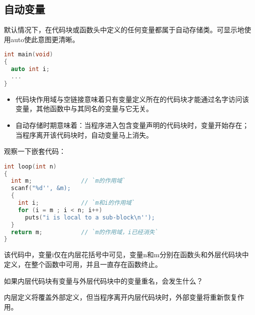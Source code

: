 \subsection{自动变量}
\begin{frame}[fragile]\ft{\subsecname}
默认情况下，在代码块或函数头中定义的任何变量都属于自动存储类。可显示地使用{\tf auto}使此意图更清晰。
\begin{lstlisting}[language=c,frame=single]
int main(void)
{
  auto int i;
  ...
}  
\end{lstlisting}
\end{frame}

\begin{frame}[fragile]\ft{\subsecname}
  \begin{itemize}
  \item \textcolor{acolor1}{代码块作用域与空链接}意味着只有变量定义所在的代码块才能通过名字访问该变量，其他函数中与其同名的变量与它无关。\\[0.1in]
  \item 自动存储时期意味着：\textcolor{acolor3}{当程序进入包含变量声明的代码块时，变量开始存在；当程序离开该代码块时，自动变量马上消失。}
  \end{itemize}
\end{frame}

\begin{frame}[fragile]\ft{\subsecname}
观察一下嵌套代码：
\begin{lstlisting}[language=c,frame=single]
int loop(int n)
{
  int m;              // `m的作用域`
  scanf("%d'', &m);
  {
    int i;            // `m和i的作用域`
    for (i = m ; i < n; i++)
      puts("i is local to a sub-block\n'');
  }
  return m;           // `m的作用域，i已经消失`
}  
\end{lstlisting}
\end{frame}

\begin{frame}[fragile]\ft{\subsecname}
该代码中，变量{\tf i}仅在内层花括号中可见，变量{\tf n}和{\tf m}分别在函数头和外层代码块中定义，在整个函数中可用，并且一直存在函数终止。
\end{frame}

\begin{frame}[fragile]\ft{\subsecname}
  \begin{wenti}
    如果内层代码块有变量与外层代码块中的变量重名，会发生什么？
  \end{wenti} \pause 
  
  内层定义将覆盖外部定义，但当程序离开内层代码块时，外部变量将重新恢复作用。
\end{frame}

